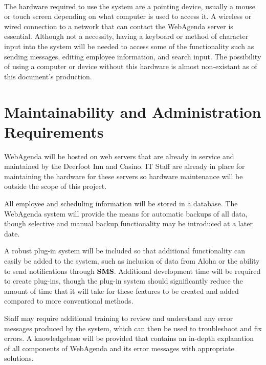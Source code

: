 \documentclass[letterpaper,12pt]{report}
\begin{document}
\paragraph*{}\hspace{0.6cm}The hardware required to use the system are a pointing device, usually a mouse or touch screen depending on what computer is used to access it. A wireless or wired connection to a network that can contact the WebAgenda server is essential. Although not a necessity, having a keyboard or method of character input into the system will be needed to access some of the functionality such as sending messages, editing employee information, and search input. The possibility of using a computer or device without this hardware is almost non-existant as of this document's production.
	

\pagebreak

\section{Maintainability and Administration Requirements}
\hspace{1cm}WebAgenda will be hosted on web servers that are already in service and maintained by the Deerfoot Inn and Casino.  IT Staff are already in place for maintaining the hardware for these servers so hardware maintenance will be outside the scope of this project.

All employee and scheduling information will be stored in a database.  The WebAgenda system will provide the means for automatic backups of all data, though selective and manual backup functionality may be introduced at a later date.

	A robust plug-in system will be included so that additional functionality can easily be added to the system, such as inclusion of data from Aloha or the ability to send notifications through \textbf{SMS}.  Additional development time will be required to create plug-ins, though the plug-in system should significantly reduce the amount of time that it will take for these features to be created and added compared to more conventional methods.

	Staff may require additional training to review and understand any error messages produced by the system, which can then be used to troubleshoot and fix errors.  A knowledgebase will be provided that contains an in-depth explanation of all components of WebAgenda and its error messages with appropriate solutions.
\end{document}
